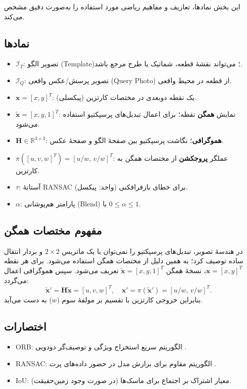 
این بخش نمادها، تعاریف و مفاهیم ریاضی مورد استفاده را به‌صورت دقیق مشخص می‌کند.

\subsection{نمادها}
\begin{itemize}
  \item $\mathcal{I}_T$: تصویر الگو (Template)؛ می‌تواند نقشهٔ قطعه، شماتیک یا طرح مرجع باشد.
  \item $\mathcal{I}_Q$: تصویر پرسش/عکس واقعی (Query Photo) از قطعه در محیط واقعی.
  \item $\mathbf{x}=[x,y]^T$: یک نقطه دوبعدی در مختصات کارتزین (پیکسلی).
  \item $\tilde{\mathbf{x}}=[x,y,1]^T$: نمایش \textbf{همگن} نقطه؛ برای اعمال تبدیل‌های پرسپکتیو استفاده می‌شود.
  \item $\mathbf{H}\in\mathbb{R}^{3\times3}$: \textbf{هموگرافی}؛ نگاشت پرسپکتیو بین صفحهٔ الگو و صفحهٔ عکس.
  \item $\pi([u,v,w]^T)=[u/w,\, v/w]^T$: عملگر \textbf{پروجکشن} از مختصات همگن به کارتزین.
  \item $\tau$: آستانهٔ RANSAC برای خطای بازفرافکنی (واحد: پیکسل).
  \item $\alpha$: پارامتر هم‌پوشانی (Blend) با $0\le \alpha \le 1$.
\end{itemize}

\subsection{مفهوم مختصات همگن}
در هندسهٔ تصویر، تبدیل‌های پرسپکتیو را نمی‌توان با یک ماتریس $2\times2$ و بردار انتقال ساده توصیف کرد؛ به همین دلیل از مختصات همگن استفاده می‌شود. برای هر نقطه $\mathbf{x}=[x,y]^T$، نسخهٔ همگن $\tilde{\mathbf{x}}=[x,y,1]^T$ تعریف می‌شود. سپس هموگرافی اعمال می‌گردد:
\[
\tilde{\mathbf{x}}' = \mathbf{H}\tilde{\mathbf{x}} = [u,v,w]^T,
\quad \mathbf{x}' = \pi(\tilde{\mathbf{x}}')=[u/w,\, v/w]^T.
\]
بنابراین خروجی کارتزین با تقسیم بر مولفهٔ سوم ($w$) به دست می‌آید.

\subsection{اختصارات}
\begin{itemize}
  \item ORB: الگوریتم سریع استخراج ویژگی و توصیف‌گر دودویی \cite{Rublee2011ORB}.
  \item RANSAC: الگوریتم مقاوم برای برازش مدل در حضور داده‌های پرت \cite{FischlerBolles1981}.
  \item IoU: معیار اشتراک بر اجتماع برای ماسک‌ها (در صورت وجود زمین‌حقیقت).
\end{itemize}

